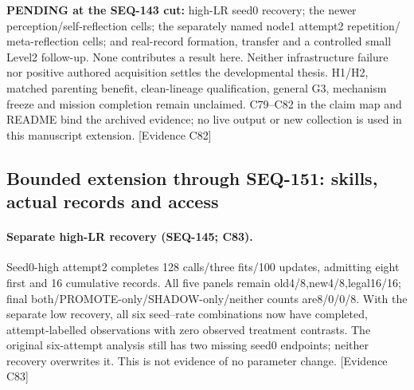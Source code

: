 \documentclass[11pt]{article}
\begin{document}
\noindent\textbf{PENDING at the SEQ-143 cut:} high-LR seed0 recovery; the newer
perception/self-reflection cells; the separately named node1 attempt2 repetition/
meta-reflection cells; and real-record formation, transfer and a controlled
small Level2 follow-up. None contributes a result here. Neither infrastructure
failure nor positive authored acquisition settles the developmental thesis.
H1/H2, matched parenting benefit, clean-lineage qualification, general G3,
mechanism freeze and mission completion remain unclaimed. C79--C82 in the claim
map and README bind the archived evidence; no live output or new collection is
used in this manuscript extension. \textsf{[Evidence C82]}


\subsection{Bounded extension through SEQ-151: skills, actual records and access}
\label{sec:seq151-extension}
\paragraph{Separate high-LR recovery (SEQ-145; C83).}
Seed0-high attempt2 completes 128 calls/three fits/100 updates, admitting eight
first and 16 cumulative records. All five panels remain old4/8,new4/8,legal16/16;
final both/PROMOTE-only/SHADOW-only/neither counts are8/0/0/8. With the separate
low recovery, all six seed--rate combinations now have completed, attempt-labelled
observations with zero observed treatment contrasts. The original six-attempt
analysis still has two missing seed0 endpoints; neither recovery overwrites it.
This is not evidence of no parameter change. \textsf{[Evidence C83]}
\end{document}
